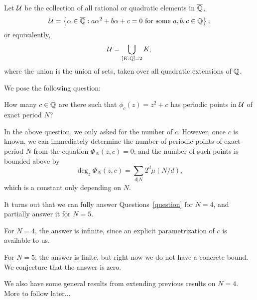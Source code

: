 Let $\mathcal{U}$ be the collection of all rational or quadratic elements in
$\overline{\mathbb{Q}}$,
\[
\mathcal{U} = \left\{\alpha \in \overline{\mathbb{Q}}: \text{$a \alpha^2 + b \alpha + c = 0$
    for some $a, b, c \in \mathbb{Q}$}\right\},
\]
or equivalently,
\[
\mathcal{U} = \bigcup_{[K : \mathbb{Q}] = 2}K,
\]
where the union is the union of sets, taken over all quadratic
extensions of $\mathbb{Q}$.

We pose the following question:

\begin{question}
  \label{question}
  How many $c \in \mathbb{Q}$ are there such that $\phi_c(z) = z^2 + c$ has
  periodic points in $\mathcal{U}$ of exact period $N$?
\end{question}

\begin{remark}
  In the above question, we only asked for the number of $c$. However,
  once $c$ is known, we can immediately determine the number of
  periodic points of exact period $N$ from the equation $\Phi_N(z, c)
  = 0$; and the number of such points is bounded above by
  \[
  \deg_z \Phi_N(z, c) = \sum_{d|N}2^d \mu(N/d),
  \]
  which is a constant only depending on $N$.
\end{remark}

It turns out that we can fully answer Questions~\ref{question} for $N
= 4$, and partially answer it for $N = 5$.

For $N = 4$, the answer is infinite, since an explicit parametrization
of $c$ is available to us.

For $N = 5$, the answer is finite, but right now we do not have a
concrete bound. We conjecture that the answer is zero.

We also have some general results from extending previous results on
$N = 4$. More to follow later...

